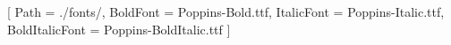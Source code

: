 \usepackage{emoji}
\setmainfont{Poppins-Regular.ttf}[
    Path = ./fonts/,
    BoldFont = Poppins-Bold.ttf,
    ItalicFont = Poppins-Italic.ttf,
    BoldItalicFont = Poppins-BoldItalic.ttf
]
